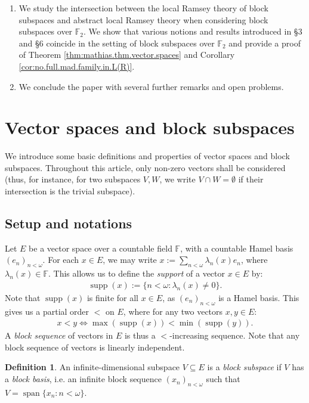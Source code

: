 \documentclass[10pt,a4paper]{amsart}
\theoremstyle{plain}
\numberwithin{equation}{section}
\theoremstyle{definition}
\newtheorem{definition}[theorem]{Definition}
\newcommand{\func}{\operatorname}
\newcommand{\supp}{\func{supp}}
\let\Sec\S
\renewcommand{\S}{\mathcal{S}}
\begin{document}
\begin{enumerate}
    \item[(\Sec\ref{sec:TRS.block.subspaces})] We study the intersection between the local Ramsey theory of block subspaces and abstract local Ramsey theory when considering block subspaces over $\mathbb{F}_2$. We show that various notions and results introduced in \Sec3 and \Sec6 coincide in the setting of block subspaces over $\mathbb{F}_2$ and provide a proof of Theorem \ref{thm:mathias.thm.vector.spaces} and Corollary \ref{cor:no.full.mad.family.in.L(R)}.
    
    \item[(\Sec\ref{sec:conclusion})] We conclude the paper with several further remarks and open problems.
\end{enumerate}

\section{Vector spaces and block subspaces}
\label{sec:setup}
We introduce some basic definitions and properties of vector spaces and block subspaces. Throughout this article, only non-zero vectors shall be considered (thus, for instance, for two subspaces $V,W$, we write $V \cap W = \emptyset$ if their intersection is the trivial subspace).

\subsection{Setup and notations}
Let $E$ be a vector space over a countable field $\mathbb{F}$, with a countable Hamel basis $(e_n)_{n<\omega}$. For each $x \in E$, we may write $x := \sum_{n<\omega} \lambda_n(x)e_n$, where $\lambda_n(x) \in \mathbb{F}$. This allows us to define the \emph{support} of a vector $x \in E$ by:
\begin{align*}
    \supp(x) := \{n < \omega : \lambda_n(x) \neq 0\}.
\end{align*}
Note that $\supp(x)$ is finite for all $x \in E$, as $(e_n)_{n<\omega}$ is a Hamel basis. This gives us a partial order $<$ on $E$, where for any two vectors $x,y \in E$:
\begin{align*}
    x < y \iff \max(\supp(x)) < \min(\supp(y)).
\end{align*}
A \emph{block sequence} of vectors in $E$ is thus a $<$-increasing sequence. Note that any block sequence of vectors is linearly independent. 

\begin{definition}
    An infinite-dimensional subspace $V \subseteq E$ is a \emph{block subspace} if $V$ has a \emph{block basis}, i.e. an infinite block sequence $(x_n)_{n<\omega}$ such that $V = \func{span}\{x_n : n < \omega\}$.
\end{definition}
\end{document}
